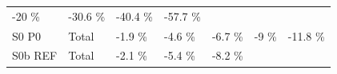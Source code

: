 \documentclass[]{article}
\begin{document}
\begin{longtable}[]{@{}lllllll@{}}
\begin{minipage}[t]{0.11\columnwidth}
-20 \%\strut
\end{minipage} & \begin{minipage}[t]{0.11\columnwidth}\raggedright\strut
-30.6 \%\strut
\end{minipage} & \begin{minipage}[t]{0.11\columnwidth}\raggedright\strut
-40.4 \%\strut
\end{minipage} & \begin{minipage}[t]{0.11\columnwidth}\raggedright\strut
-57.7 \%\strut
\end{minipage}\tabularnewline
\begin{minipage}[t]{0.14\columnwidth}\raggedright\strut
S0 P0\strut
\end{minipage} & \begin{minipage}[t]{0.13\columnwidth}\raggedright\strut
Total\strut
\end{minipage} & \begin{minipage}[t]{0.11\columnwidth}\raggedright\strut
-1.9 \%\strut
\end{minipage} & \begin{minipage}[t]{0.11\columnwidth}\raggedright\strut
-4.6 \%\strut
\end{minipage} & \begin{minipage}[t]{0.11\columnwidth}\raggedright\strut
-6.7 \%\strut
\end{minipage} & \begin{minipage}[t]{0.11\columnwidth}\raggedright\strut
-9 \%\strut
\end{minipage} & \begin{minipage}[t]{0.11\columnwidth}\raggedright\strut
-11.8 \%\strut
\end{minipage}\tabularnewline
\begin{minipage}[t]{0.14\columnwidth}\raggedright\strut
S0b REF\strut
\end{minipage} & \begin{minipage}[t]{0.13\columnwidth}\raggedright\strut
Total\strut
\end{minipage} & \begin{minipage}[t]{0.11\columnwidth}\raggedright\strut
-2.1 \%\strut
\end{minipage} & \begin{minipage}[t]{0.11\columnwidth}\raggedright\strut
-5.4 \%\strut
\end{minipage} & \begin{minipage}[t]{0.11\columnwidth}\raggedright\strut
-8.2 \%\strut
\end{minipage} & \begin{minipage}[t]{0.11\columnwidth}\raggedright\strut

\end{minipage}
\end{longtable}
\end{document}
